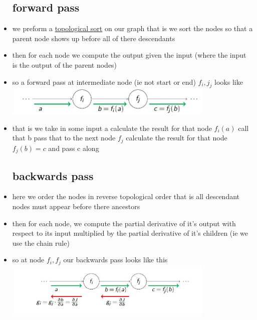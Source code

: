 \documentclass{article}
\begin{document}
\begin{itemize}
\subsection{forward pass}
\item we preform a \href{https://en.wikipedia.org/wiki/Topological_sorting}{topological sort} on our graph that is we sort the nodes so that a parent node shows up before all of there descendants
\item then for each node we compute the output given the input (where the input is the output of the parent nodes)
\item so a forward pass at intermediate node (ie not start or end) $f_i, j_j$ looks like \\ \includegraphics[width=10cm]{lecture_notes/lecture_11/immages/l11_15.JPG}
\item that is we take in some input a calculate the result for that node $f_i(a)$ call that b pass that to the next node $f_j$ calculate the result for that node $f_j(b)=c$ and pass c along 
\subsection{backwards pass }
\item here we order the nodes in reverse topological order that is all descendant nodes must appear before there ancestors 
\item then for each node, we compute the partial derivative of it's output with respect to its input multiplied by the partial derivative of it's children (ie we use the chain rule)
\item so at node $f_i, f_j$ our backwards pass looks like this \\ \includegraphics[width=10cm]{lecture_notes/lecture_11/immages/l11_16.JPG}

\end{itemize}
\end{document}
